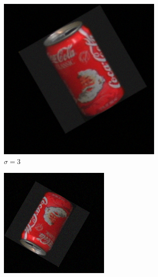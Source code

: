 \begin{figure}[tbp]
	\begin{subfigure}{0.329\textwidth}
        \centering
    \includegraphics[width=\textwidth]{figures/noise/gauss3.png}
	\caption{$\sigma = 3$}
	\end{subfigure}
    \begin{subfigure}{0.329\textwidth}
        \centering
    \includegraphics[width=\textwidth]{figures/noise/gauss5.png}

\end{subfigure}
\end{figure}
